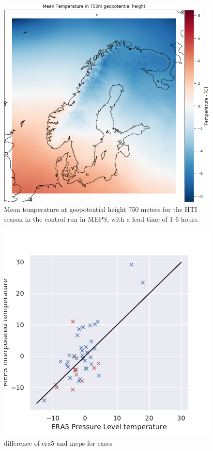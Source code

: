 \begin{figure}
    \centering
    \includegraphics[width=\textwidth]{Figures/MeanT750MEPS.png}
    \caption{Mean temperature at geopotential height 750 meters for the HTI season in the control run in MEPS, with a lead time of 1-6 hours.}
    \label{fig:MeanT750MEPS}
\end{figure}

\begin{figure}
    \centering
    \includegraphics[width=\textwidth]{Figures/T750MEPSera5diff.pdf}
    \caption{difference of era5 and meps for cases}
    \label{fig:eramepsdiff}
\end{figure}

